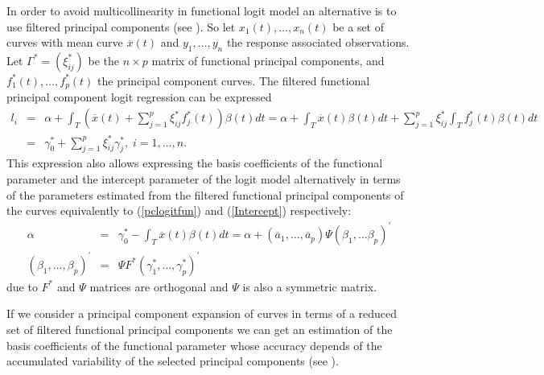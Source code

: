 In order to avoid multicollinearity in functional logit model an alternative is to use filtered principal components (see \cite{Escabias04}). So let $x_{1}\left( t\right) ,\ldots ,x_{n}\left( t\right) $ be a set of curves with mean curve $\overline{x}\left( t\right)$ and $y_{1},\ldots,y_{n}$ the response associated observations. Let $\Gamma^{\ast}=(\xi_{ij}^{\ast})$ be the $n \times p$ matrix of functional principal components, and $f_1^{\ast}(t),\ldots,f_p^{\ast}(t)$ the principal component curves. The filtered functional principal component logit regression can be expressed
\begin{eqnarray*}
l_{i}&=&\alpha +\int_{T} \left(\overline{x}(t) + \sum_{j=1}^{p }\xi_{ij}^{\ast}f_{j}^{\ast}\left( t\right) \right)  \beta \left( t\right)dt
=\alpha
+\int_{T} \overline{x}(t) \beta \left( t\right)dt + \sum_{j=1}^{p }\xi_{ij}^{\ast} \int_{T} f_{j}^{\ast}\left( t\right) \beta \left( t\right)dt \\
&=&\gamma_0^{\ast}+\sum_{j=1}^{p }\xi_{ij}^{\ast} \gamma_j^{\ast},\;i=1,\ldots ,n.
\end{eqnarray*}
This expression also allows expressing the basis coefficients of the functional parameter and the intercept parameter of the logit model alternatively in terms of the parameters estimated from the filtered functional principal components of the curves equivalently to (\ref{pclogitfun}) and (\ref{Intercept}) respectively:
\begin{eqnarray}
\alpha &=& \gamma_0^{\ast} - \int_{T} \overline{x}(t) \beta \left( t\right)dt = \alpha +(\overline{a}_1,\ldots,\overline{a}_p) \Psi (\beta_1,\ldots\beta_p)^{\prime} \\
(\beta_1,\ldots,\beta_p)^{\prime} &=& \Psi F^{\ast} (\gamma_1^{\ast},\ldots, \gamma_p^{\ast})^{\prime}
\label{filteredPCA}
\end{eqnarray}
due to $F^{\ast}$ and $\Psi$ matrices are orthogonal and $\Psi$ is also a symmetric matrix.

If we consider a principal component expansion of curves in terms of a reduced set of filtered functional principal components we can get an estimation of the basis coefficients of the functional parameter whose accuracy depends of the accumulated variability of the selected principal components (see \cite{Escabias04}).

